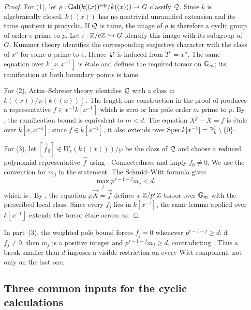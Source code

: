 \begin{proof}
For (1), let
$\rho:\operatorname{Gal}(k((x))^{\mathrm{sep}}/k((x)))\to G$ classify $\mathcal{Q}$. Since
$k$ is algebraically closed, $k((x))$ has no nontrivial unramified extension
and its tame quotient is procyclic. If $\mathcal{Q}$ is tame, the image of $\rho$ is
therefore a cyclic group of order $e$ prime to $p$. Let
$\iota:\mathbb{Z}/e\mathbb{Z}\hookrightarrow G$ identify this image with its subgroup of
$G$. Kummer theory identifies the corresponding surjective character with
the class of $x^a$ for some $a$ prime to $e$. Hence $\mathcal{Q}$ is induced from
$T^e=x^a$. The same equation over $k[x,x^{-1}]$ is \'etale and defines the
required torsor on $\mathbb{G}_m$; its ramification at both boundary points is tame.

For (2), Artin--Schreier theory identifies $\mathcal{Q}$ with a class in
$k((x))/\wp(k((x)))$. The length-one construction in the proof of
 produces a representative
$f\in x^{-1}k[x^{-1}]$ which is zero or has pole order $m$ prime to $p$.
By , the ramification bound is
equivalent to $m<d$. The equation $X^p-X=f$ is \'etale over
$k[x,x^{-1}]$; since $f\in k[x^{-1}]$, it also extends over
$\operatorname{Spec} k[x^{-1}]=\mathbb{P}^1_k\setminus\{0\}$.

For (3), let $[\vec f_0]\in W_r(k((x)))/\wp$ be the class of $\mathcal{Q}$ and
choose a reduced polynomial representative $\vec f$ using
. Connectedness and
 imply $f_0\neq0$. We use
the convention for $m_j$ in the statement. The Schmid--Witt formula gives
\[
\max_j p^{r-1-j}m_j<d,
\]
which is . By
, the equation
$\wp\vec X=\vec f$ defines a $\mathbb{Z}/p^r\mathbb{Z}$-torsor over $\mathbb{G}_m$ with the
prescribed local class. Since every $f_j$ lies in $k[x^{-1}]$, the same lemma
applied over $k[x^{-1}]$ extends the torsor \'etale across $\infty$.
\end{proof}

\begin{rem*}\label{rem:realization_Wr_sanity}
In part~(3), the weighted pole bound forces $f_j=0$ whenever
$p^{r-1-j}\geq d$: if $f_j\neq0$, then $m_j$ is a positive integer and
$p^{r-1-j}m_j\geq d$, contradicting
. Thus a break smaller than $d$ imposes a
visible restriction on every Witt component, not only on the last one.
\end{rem*}

\subsection{Three common inputs for the cyclic calculations}

